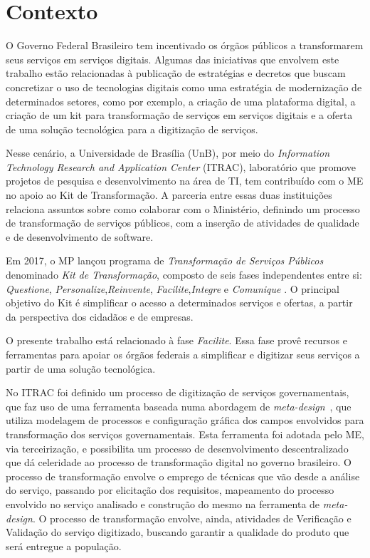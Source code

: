 \section{Contexto}

O Governo Federal Brasileiro tem incentivado os órgãos públicos a transformarem seus serviços em serviços digitais. Algumas das iniciativas que envolvem este trabalho estão relacionadas à publicação de estratégias e decretos que buscam concretizar o uso de tecnologias digitais como uma estratégia de modernização de determinados setores, como por exemplo, a criação de uma plataforma digital, a criação de um kit para transformação de serviços em serviços digitais e a oferta de uma solução tecnológica para a digitização de serviços. 

Nesse cenário, a Universidade de Brasília (UnB), por meio do \textit{Information Technology Research and Application Center} (ITRAC), laboratório que promove projetos de pesquisa e desenvolvimento na área de TI, tem contribuído com o ME no apoio ao Kit de Transformação. A parceria entre essas duas instituições relaciona assuntos sobre como colaborar com o Ministério, definindo um processo de transformação de serviços públicos, com a inserção de atividades de qualidade e de desenvolvimento de software.

Em 2017, o MP lançou programa de \textit{Transformação de Serviços Públicos} denominado \textit{Kit de Transformação}, composto de seis fases independentes entre si: \textit{Questione}, \textit{Personalize},\textit{Reinvente}, \textit{Facilite},\textit{Integre} e \textit{Comunique} \cite{BRASIL2017}. O principal objetivo do Kit é simplificar o acesso a determinados serviços e ofertas, a partir da perspectiva dos cidadãos e de empresas.

O presente trabalho está relacionado à fase \textit{Facilite}. Essa fase provê recursos e ferramentas para apoiar os órgãos federais a simplificar e digitizar seus serviços a partir de uma solução tecnológica.

No ITRAC foi definido um processo de digitização de serviços governamentais, que faz uso de uma ferramenta baseada numa abordagem de \textit{meta-design}~\cite{fogli2012meta}, que utiliza modelagem de processos e configuração gráfica dos campos envolvidos para transformação dos serviços governamentais. Esta ferramenta foi adotada pelo ME, via terceirização, e possibilita um processo de desenvolvimento descentralizado que dá celeridade ao processo de transformação digital no governo brasileiro. O processo de transformação envolve o emprego de técnicas que vão desde a análise do serviço, passando por elicitação dos requisitos, mapeamento do processo envolvido no serviço analisado e construção do mesmo na ferramenta de \textit{meta-design}. O processo de transformação envolve, ainda, atividades de Verificação e Validação do serviço digitizado, buscando garantir a qualidade do produto que será entregue a população.

